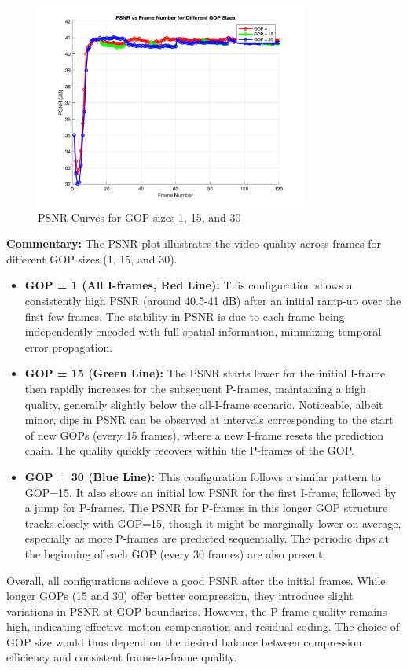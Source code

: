 \documentclass{article}
\begin{document}
\begin{figure}[h]
    \centering
    \includegraphics[width=0.8\textwidth]{psnr_plot.png}
    \caption{PSNR Curves for GOP sizes 1, 15, and 30}
    \label{fig:psnr_curves}
\end{figure}

\noindent \textbf{Commentary:} The PSNR plot illustrates the video quality across frames for different GOP sizes (1, 15, and 30).
\begin{itemize}
    \item \textbf{GOP = 1 (All I-frames, Red Line):} This configuration shows a consistently high PSNR (around 40.5-41 dB) after an initial ramp-up over the first few frames. The stability in PSNR is due to each frame being independently encoded with full spatial information, minimizing temporal error propagation.
    \item \textbf{GOP = 15 (Green Line):} The PSNR starts lower for the initial I-frame, then rapidly increases for the subsequent P-frames, maintaining a high quality, generally slightly below the all-I-frame scenario. Noticeable, albeit minor, dips in PSNR can be observed at intervals corresponding to the start of new GOPs (every 15 frames), where a new I-frame resets the prediction chain. The quality quickly recovers within the P-frames of the GOP.
    \item \textbf{GOP = 30 (Blue Line):} This configuration follows a similar pattern to GOP=15. It also shows an initial low PSNR for the first I-frame, followed by a jump for P-frames. The PSNR for P-frames in this longer GOP structure tracks closely with GOP=15, though it might be marginally lower on average, especially as more P-frames are predicted sequentially. The periodic dips at the beginning of each GOP (every 30 frames) are also present.
\end{itemize}
Overall, all configurations achieve a good PSNR after the initial frames. While longer GOPs (15 and 30) offer better compression, they introduce slight variations in PSNR at GOP boundaries. However, the P-frame quality remains high, indicating effective motion compensation and residual coding. The choice of GOP size would thus depend on the desired balance between compression efficiency and consistent frame-to-frame quality.
\end{document}
